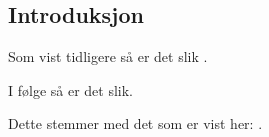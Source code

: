 \documentclass{article}
\begin{document}
\begin{huge}

\tableofcontents

\section{Introduksjon}

Som vist tidligere så er det slik \parencite{Wennberg2002}.

I følge \textcite{Wennberg2002} så er det slik.

Dette stemmer med det som er vist her: \cite{Wennberg2002}.

\printbibliography
{}

\end{huge}
\end{document}
